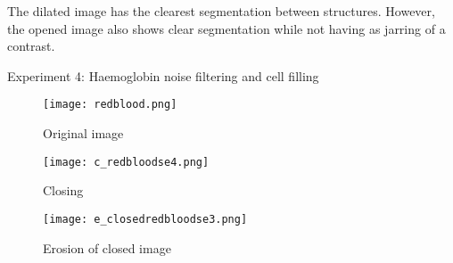 \documentclass[a4paper]{article}
\begin{document}
The dilated image has the clearest segmentation between structures. However, the opened image also shows clear segmentation while not having as jarring of a contrast. \\
\newpage

\large{Experiment 4: Haemoglobin noise filtering and cell filling} \\ 
\begin{figure}[htp]
    \centering
    \texttt{[image: redblood.png]}
    \caption{Original image}
    \label{fig:erosionSym}
\end{figure}
\begin{figure}[ht] 
  \label{ fig7} 
  \begin{minipage}[b]{0.5\linewidth}
    \centering
    \texttt{[image: c\_redbloodse4.png]} 
    \caption{Closing} 
    \vspace{4ex}
  \end{minipage}%
  \begin{minipage}[b]{0.5\linewidth}
    \centering
    \texttt{[image: e\_closedredbloodse3.png]} 
    \caption{Erosion of closed image} 
    \vspace{4ex}
  \end{minipage} 
\end{figure} \\
\end{document}
